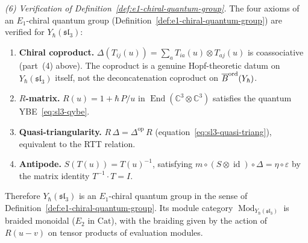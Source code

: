 \begin{example}
\medskip
\noindent\emph{(6) Verification of
Definition~\ref{def:e1-chiral-quantum-group}.}
The four axioms of an $E_1$-chiral quantum group
(Definition~\ref{def:e1-chiral-quantum-group}) are
verified for $Y_\hbar(\mathfrak{sl}_3)$:
\begin{enumerate}[label=\textup{(\roman*)},nosep]
\item \textbf{Chiral coproduct.}\enspace
 $\Delta(T_{ij}(u)) = \sum_a T_{ia}(u)\otimes T_{aj}(u)$
 is coassociative (part~(4) above). The coproduct is
 a genuine Hopf-theoretic datum on
 $Y_\hbar(\mathfrak{sl}_3)$ itself, not the
 deconcatenation coproduct on $\overline{B}^{\mathrm{ord}}(Y_\hbar)$.
\item \textbf{$R$-matrix.}\enspace
 $R(u) = 1 + \hbar\,P/u$ in
 $\operatorname{End}(\mathbb{C}^3\otimes\mathbb{C}^3)$
 satisfies the quantum YBE~\eqref{eq:sl3-qybe}.
\item \textbf{Quasi-triangularity.}\enspace
 $R\,\Delta = \Delta^{\mathrm{op}}\,R$
 (equation~\eqref{eq:sl3-quasi-triang}), equivalent to
 the RTT relation.
\item \textbf{Antipode.}\enspace
 $S(T(u)) = T(u)^{-1}$, satisfying
 $m\circ(S\otimes\operatorname{id})\circ\Delta = \eta\circ\varepsilon$
 by the matrix identity $T^{-1}\cdot T = I$.
\end{enumerate}
Therefore $Y_\hbar(\mathfrak{sl}_3)$ is an $E_1$-chiral
quantum group in the sense of
Definition~\ref{def:e1-chiral-quantum-group}. Its module
category $\operatorname{Mod}_{Y_\hbar(\mathfrak{sl}_3)}$ is
braided monoidal ($E_2$ in $\mathrm{Cat}$), with the braiding
given by the action of $R(u{-}v)$ on tensor products of
evaluation modules.


\end{example}
